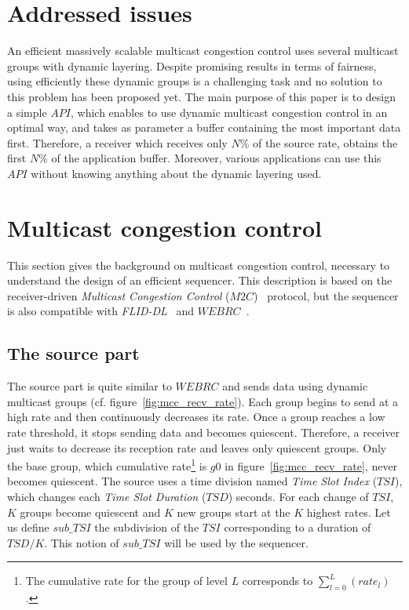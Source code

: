 \documentclass[a4paper]{article}
\begin{document}
\section{Addressed issues}
    An efficient massively scalable multicast congestion control uses several
    multicast groups with dynamic layering.  Despite promising results in terms
    of fairness, using efficiently these dynamic groups is a challenging task
    and no solution to this problem has been proposed yet.
The main purpose of this paper is to design a simple $API$, which enables to
    use dynamic multicast congestion control in an optimal way, and takes as
    parameter a buffer containing the most important data first. Therefore, a
    receiver which receives only $N$\% of the source rate, obtains the first
    $N\%$ of the application buffer.  Moreover, various applications can use
    this $API$ without knowing anything about the dynamic layering used.

\section{Multicast congestion control}
    This section gives the background on multicast congestion control, necessary
    to understand the design of an efficient sequencer.  This description
    is based on the receiver-driven \textit{Multicast Congestion Control}
    ($M2C$)~\cite{lucas_fair_2009} protocol, but the sequencer is also
    compatible with \textit{FLID-DL}~\cite{byers_flid-dl:_2002} and
    $WEBRC$~\cite{luby_wave_2002}.

    \subsection{The source part}
        The source part is quite similar to $WEBRC$ and sends data using dynamic
        multicast groups (cf.  figure~\ref{fig:mcc_recv_rate}). Each group
        begins to send at a high rate and then continuously decreases its rate.
        Once a group reaches a low rate threshold, it stops sending data and
        becomes quiescent.  Therefore, a receiver just waits to decrease its
        reception rate and leaves only quiescent groups.  Only the base group,
        which cumulative rate\footnote{
            The cumulative rate for the group of level $L$ corresponds to
                $\sum_{l=0}^{L}\left(rate_l\right)$.
        }
        is $g0$ in figure~\ref{fig:mcc_recv_rate}, never becomes quiescent.
The source uses a time division named \textit{Time Slot Index} ($TSI$),
        which changes each \textit{Time Slot Duration} ($TSD$) seconds. For
        each change of $TSI$, $K$ groups become quiescent and $K$ new groups
        start at the $K$ highest rates. Let us define $sub\_TSI$ the subdivision
        of the $TSI$ corresponding to a duration of $TSD/K$. This notion of
        $sub\_TSI$ will be used by the sequencer.
\end{document}
